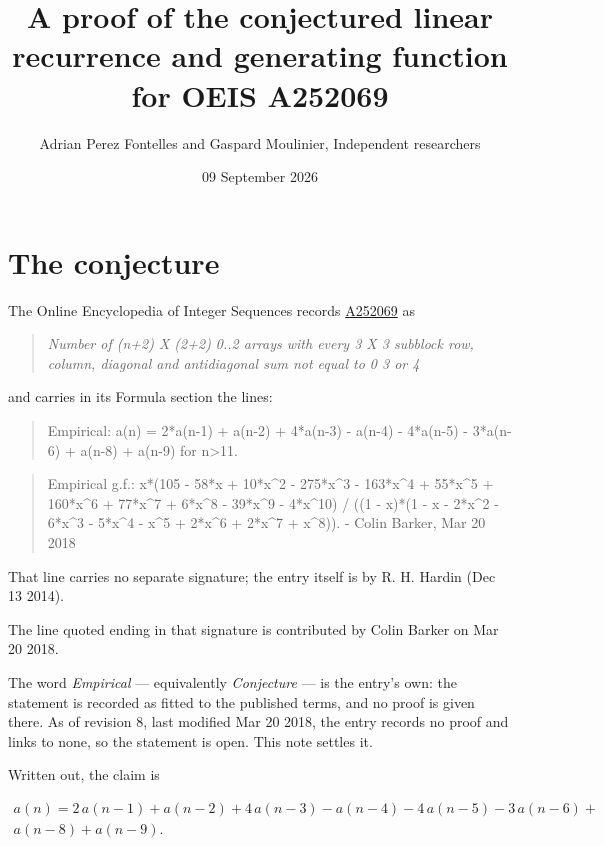 \documentclass[11pt]{article}
\title{A proof of the conjectured linear recurrence and generating function for OEIS A252069}
\author{Adrian Perez Fontelles and Gaspard Moulinier, Independent researchers}
\date{09 September 2026}
\theoremstyle{definition}
\begin{document}
\maketitle
\section{The conjecture}

The Online Encyclopedia of Integer Sequences records \href{https://oeis.org/A252069}{A252069} as

\begin{quote}\itshape Number of (n+2) X (2+2) 0..2 arrays with every 3 X 3 subblock row, column, diagonal and antidiagonal sum not equal to 0 3 or 4\end{quote}

and carries in its Formula section the lines:

\begin{quote}\ttfamily Empirical: a(n) = 2*a(n-1) + a(n-2) + 4*a(n-3) - a(n-4) - 4*a(n-5) - 3*a(n-6) + a(n-8) + a(n-9) for n>11.\end{quote}

\begin{quote}\ttfamily Empirical g.f.: x*(105 - 58*x + 10*x\textasciicircum{}2 - 275*x\textasciicircum{}3 - 163*x\textasciicircum{}4 + 55*x\textasciicircum{}5 + 160*x\textasciicircum{}6 + 77*x\textasciicircum{}7 + 6*x\textasciicircum{}8 - 39*x\textasciicircum{}9 - 4*x\textasciicircum{}10) / ((1 - x)*(1 - x - 2*x\textasciicircum{}2 - 6*x\textasciicircum{}3 - 5*x\textasciicircum{}4 - x\textasciicircum{}5 + 2*x\textasciicircum{}6 + 2*x\textasciicircum{}7 + x\textasciicircum{}8)). - Colin Barker, Mar 20 2018\end{quote}

That line carries no separate signature; the entry itself is by R. H. Hardin (Dec 13 2014).

The line quoted ending in that signature is contributed by Colin Barker on Mar 20 2018.

The word {\itshape Empirical} --- equivalently {\itshape Conjecture} --- is the entry's own: the statement is recorded as fitted to the published terms, and no proof is given there. As of revision 8, last modified Mar 20 2018, the entry records no proof and links to none, so the statement is open. This note settles it.

Written out, the claim is

\begin{multline*} a(n) = 2\,a(n-1) + a(n-2) + 4\,a(n-3) - a(n-4) - 4\,a(n-5) - 3\,a(n-6) + \\ a(n-8) + a(n-9). \end{multline*}
\end{document}
